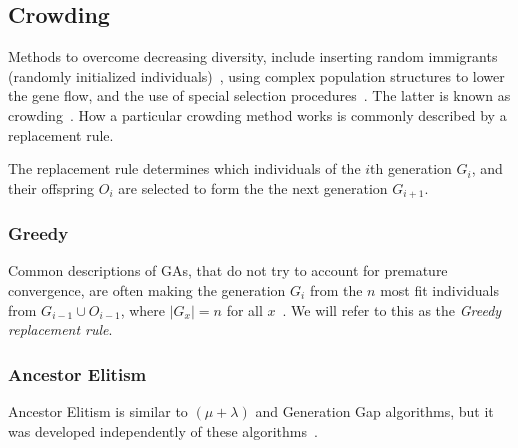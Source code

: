 \subsection{Crowding}\label{sec:replacementrules}
Methods to overcome decreasing diversity, include inserting random immigrants (randomly initialized individuals)~\cite{Cobb93geneticalgorithms}, using complex population structures to lower the gene flow, and the use of special selection procedures~\cite{ursem2002diversity}. The latter is known as crowding~\cite{DeJong:1975:ABC:907087}. How a particular crowding method works is commonly described by a replacement rule.

The replacement rule determines which individuals of the $i$th generation $G_i$,
and their offspring $O_i$ are selected to form the the next generation $G_{i+1}$.

\subsubsection{Greedy}
Common descriptions of GAs, that do not try to account for premature convergence,
are often making the generation $G_i$ from the $n$ most fit individuals from $G_{i-1} \cup O_{i-1}$, where $\lvert G_x \rvert = n$ for all $x$~\cite{masterThesisGANN}.
We will refer to this as the \emph{Greedy replacement rule}.

%
%

\subsubsection{Ancestor Elitism}
Ancestor Elitism is similar to $(\mu + \lambda)$ and Generation Gap algorithms, but it was developed independently of these algorithms~\cite[p. 34, p. 50]{Luke2013Metaheuristics}.

